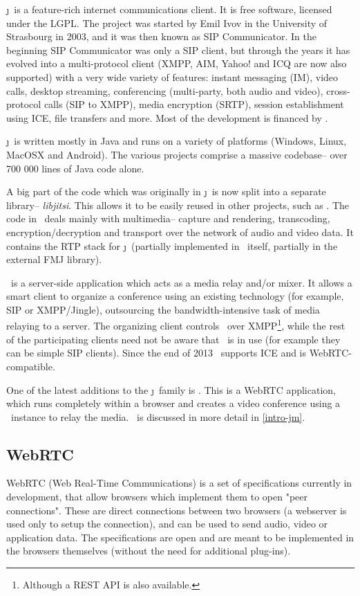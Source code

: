 \documentclass[twoside,openright,a4paper,12pt,english]{article}
\begin{document}
\j\ is a feature-rich internet communications client.
It is free software, licensed under the LGPL\cite{lgpl}.
The project was started by Emil Ivov in
the University of Strasbourg in 2003, and it was then known as SIP
Communicator. In the beginning
SIP Communicator was only a SIP client, but through the years it has evolved
into a multi-protocol
client (XMPP, AIM, Yahoo! and ICQ are now also supported) with a very wide variety
of features: instant messaging (IM), video calls, desktop streaming,
conferencing (multi-party, both audio and video), cross-protocol calls (SIP to
XMPP), media encryption (SRTP),
session establishment using ICE, file transfers and more.
Most of the development is financed by \bj.

\j\ is written mostly in Java and runs on a variety of
platforms (Windows, Linux, MacOSX and Android). The various projects comprise a massive codebase--
over 700 000 lines of Java code alone.

A big part of the code which was originally in \j\ is now split into a
separate library-- \emph{libjitsi}. This allows it to be easily reused in other
projects, such as \jvb. The code in \lj\ deals mainly with multimedia-- capture
and rendering, transcoding, encryption/decryption and transport over the
network of audio and video data. It contains the RTP stack for \j\ (partially
implemented in \lj\ itself, partially in the external FMJ library).

\jvb\ is a server-side application which acts as a media
relay and/or mixer. It allows a smart client to organize a conference
using an existing technology (for example, SIP or XMPP/Jingle), outsourcing the bandwidth-intensive task of media relaying to a server. 
The organizing client controls \jvb\ over XMPP\footnote{Although a REST API is also available.}, while the rest of the
participating clients need not be aware that \jvb\ is in use (for example they
can be simple SIP clients). Since the end of 2013 \jvb\ supports ICE and is WebRTC-compatible.

One of the latest additions to the \j\ family is
\jm\cite{jitsi-meet}. This is a WebRTC
application, which runs completely within a browser and creates a video
conference using a \jvb\ instance to relay the media. \jm\ is discussed in more detail in \ref{intro-jm}.




\subsection{WebRTC}
WebRTC (Web Real-Time Communications) is a set of specifications 
currently in development, that allow browsers which implement them to open
"peer connections". These are direct connections between two
browsers (a webserver is used only to setup the connection), and can be used to
send audio, video or application data. The specifications are open and are meant
to be implemented in the browsers themselves (without the need for additional
plug-ins).
\end{document}
